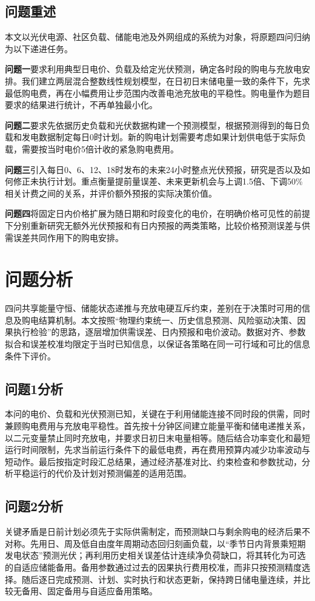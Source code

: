\documentclass[withoutpreface,bwprint]{cumcmthesis}
\begin{document}
\subsection{问题重述}
本文以光伏电源、社区负载、储能电池及外网组成的系统为对象，将原题四问归纳为以下递进任务。

\textbf{问题一}要求利用典型日电价、负载及给定光伏预测，确定各时段的购电与充放电安排。我们建立两层混合整数线性规划模型，在日初日末储电量一致的条件下，先求最低购电费，再在小幅费用让步范围内改善电池充放电的平稳性。购电量作为题目要求的结果进行统计，不再单独最小化。

\textbf{问题二}要求先依据历史负载和光伏数据构建一个预测模型，根据预测得到的每日负载和发电数据制定每日0时计划。新的购电计划需要考虑如果计划供电低于实际负载，需要按当时电价5倍计收的紧急购电费用。

\textbf{问题三}引入每日0、6、12、18时发布的未来24小时整点光伏预报，研究是否以及如何修正未执行计划。重点衡量提前量误差、未来更新机会与上调1.5倍、下调50\%相关计费之间的关系，并评价额外预报的实际决策价值。

\textbf{问题四}将固定日内价格扩展为随日期和时段变化的电价，在明确价格可见性的前提下分别重新研究无额外光伏预报和有日内预报的两类策略，比较价格预测误差与供需误差共同作用下的购电安排。


\clearpage
\section{问题分析}
四问共享能量守恒、储能状态递推与充放电硬互斥约束，差别在于决策时可用的信息及购电结算机制。本文按照“物理约束统一、历史信息预测、风险驱动决策、因果执行检验”的思路，逐层增加供需误差、日内预报和电价波动。数据对齐、参数拟合和误差校准均限定于当时已知信息，以保证各策略在同一可行域和可比的信息条件下评价。

\subsection*{问题1分析}
本问的电价、负载和光伏预测已知，关键在于利用储能连接不同时段的供需，同时兼顾购电费用与充放电平稳性。首先按十分钟区间建立能量平衡和储电递推关系，以二元变量禁止同时充放电，并要求日初日末电量相等。随后结合功率变化和最短运行时间限制，先求当前运行条件下的最低电费，再在费用预算内减少功率波动与短动作。最后按指定时段汇总结果，通过经济基准对比、约束检查和参数扰动，分析平稳运行的代价及计划对预测偏差的适用范围。

\subsection*{问题2分析}
关键矛盾是日前计划必须先于实际供需制定，而预测缺口与剩余购电的经济后果不对称。先用日、周及低自由度年周期动态回归刻画负载，以“季节日内背景乘短期发电状态”预测光伏；再利用历史相关误差估计连续净负荷缺口，将其转化为可选的自适应储能备用。备用参数通过过去的因果执行费用校准，而非只按预测精度选择。随后逐日完成预测、计划、实时执行和状态更新，保持跨日储电量连续，并比较无备用、固定备用与自适应备用策略。
\end{document}
